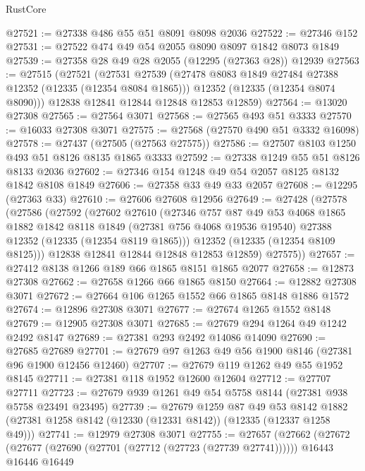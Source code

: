 \begin{lexlean}{RustCore}
\begin{coremodule}
@27521 := @27338 @486 @55 @51 @8091 @8098 @2036
@27522 := @27346 @152
@27531 := @27522 @474 @49 @54 @2055 @8090 @8097 @1842 @8073 @1849
@27539 := @27358 @28 @49 @28 @2055 (@12295 (@27363 @28)) @12939
@27563 := @27515
    (@27521
      (@27531
        @27539
        (@27478 @8083 @1849 @27484 @27388 @12352 (@12335 (@12354 @8084 @1865)))
        @12352
        (@12335 (@12354 @8074 @8090)))
      @12838
      @12841
      @12844
      @12848
      @12853
      @12859)
@27564 := @13020 @27308
@27565 := @27564 @3071
@27568 := @27565 @493 @51 @3333
@27570 := @16033 @27308 @3071
@27575 := @27568 (@27570 @490 @51 @3332 @16098)
@27578 := @27437 (@27505 (@27563 @27575))
@27586 := @27507 @8103 @1250 @493 @51 @8126 @8135 @1865 @3333
@27592 := @27338 @1249 @55 @51 @8126 @8133 @2036
@27602 := @27346 @154 @1248 @49 @54 @2057 @8125 @8132 @1842 @8108 @1849
@27606 := @27358 @33 @49 @33 @2057
@27608 := @12295 (@27363 @33)
@27610 := @27606 @27608 @12956
@27649 := @27428
    (@27578
      (@27586
        (@27592
          (@27602
            @27610
            (@27346
              @757
              @87
              @49
              @53
              @4068
              @1865
              @1882
              @1842
              @8118
              @1849
              (@27381 @756 @4068 @19536 @19540)
              @27388
              @12352
              (@12335 (@12354 @8119 @1865)))
            @12352
            (@12335 (@12354 @8109 @8125)))
          @12838
          @12841
          @12844
          @12848
          @12853
          @12859)
        @27575))
@27657 := @27412 @8138 @1266 @189 @66 @1865 @8151 @1865 @2077
@27658 := @12873 @27308
@27662 := @27658 @1266 @66 @1865 @8150
@27664 := @12882 @27308 @3071
@27672 := @27664 @106 @1265 @1552 @66 @1865 @8148 @1886 @1572
@27674 := @12896 @27308 @3071
@27677 := @27674 @1265 @1552 @8148
@27679 := @12905 @27308 @3071
@27685 := @27679 @294 @1264 @49 @1242 @2492 @8147
@27689 := @27381 @293 @2492 @14086 @14090
@27690 := @27685 @27689
@27701 := @27679 @97 @1263 @49 @56 @1900 @8146 (@27381 @96 @1900 @12456 @12460)
@27707 := @27679 @119 @1262 @49 @55 @1952 @8145
@27711 := @27381 @118 @1952 @12600 @12604
@27712 := @27707 @27711
@27723 := @27679 @939 @1261 @49 @54 @5758 @8144 (@27381 @938 @5758 @23491 @23495)
@27739 := @27679
    @1259
    @87
    @49
    @53
    @8142
    @1882
    (@27381 @1258 @8142 (@12330 (@12331 @8142)) (@12335 (@12337 @1258 @49)))
@27741 := @12979 @27308 @3071
@27755 := @27657
    (@27662
      (@27672
        (@27677 (@27690 (@27701 (@27712 (@27723 (@27739 @27741))))))
        @16443
        @16446
        @16449

\end{coremodule}
\end{lexlean}
